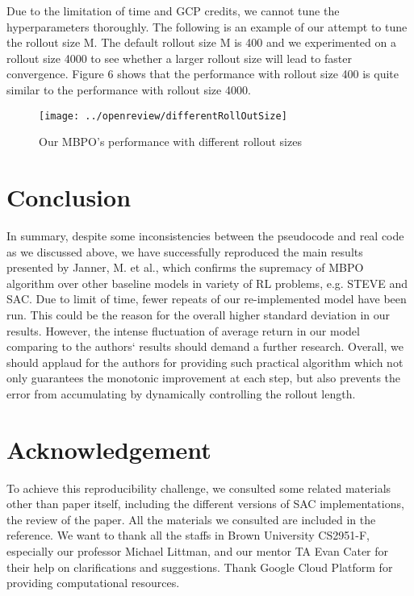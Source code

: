 Due to the limitation of time and GCP credits, we cannot tune the hyperparameters thoroughly. The following is an example of our attempt to tune the rollout size M. The default rollout size M is 400 and we experimented on a rollout size 4000 to see whether a larger rollout size will lead to faster convergence. Figure 6 shows that the performance with rollout size 400 is quite similar to the performance with rollout size 4000.

\begin{figure}[h]
  \centering
  \texttt{[image: ../openreview/differentRollOutSize]}
  \caption{Our MBPO's performance with different rollout sizes}
\end{figure}

\section{Conclusion}
In summary, despite some inconsistencies between the pseudocode and real code as we discussed above, we have successfully reproduced the main results presented by Janner, M. et al., which confirms the supremacy of MBPO algorithm over other baseline models in variety of RL problems, e.g. STEVE and SAC. Due to limit of time, fewer repeats of our re-implemented model have been run. This could be the reason for the overall higher standard deviation in our results. However, the intense fluctuation of average return in our model comparing to the authors` results should demand a further research. Overall, we should applaud for the authors for providing such practical algorithm which not only guarantees the monotonic improvement at each step, but also prevents the error from accumulating by dynamically controlling the rollout length.

\section*{Acknowledgement}
To achieve this reproducibility challenge, we consulted some related materials other than paper itself, including the different versions of SAC implementations, the review of the paper. All the materials we consulted are included in the reference.
We want to thank all the staffs in Brown University CS2951-F, especially our professor Michael Littman, and our mentor TA Evan Cater for their help on clarifications and suggestions. Thank Google Cloud Platform for providing computational resources.

\newpage

